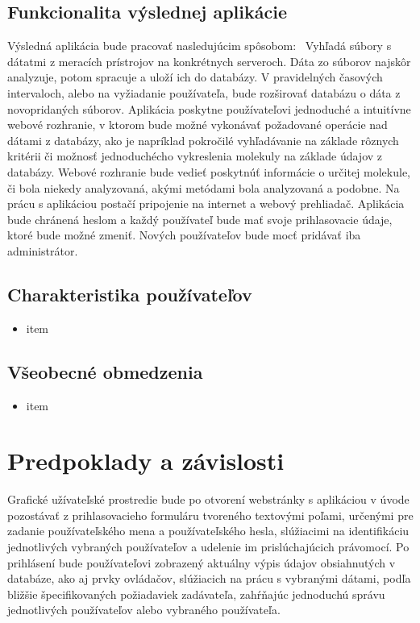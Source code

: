 \documentclass[12pt,a4paper]{article}
\begin{document}
\subsection{Funkcionalita výslednej aplikácie}
Výsledná aplikácia bude pracovať nasledujúcim spôsobom: \
Vyhľadá súbory s dátatmi z meracích prístrojov na konkrétnych serveroch. Dáta zo súborov najskôr analyzuje, potom spracuje a uloží ich do databázy.
V pravidelných časových intervaloch, alebo na vyžiadanie používateľa, bude rozširovať databázu o dáta z novopridaných súborov. Aplikácia poskytne používateľovi jednoduché a intuitívne webové rozhranie, v ktorom bude možné vykonávať požadované operácie nad dátami z databázy, ako je napríklad pokročilé vyhľadávanie na základe rôznych kritérii či možnosť jednoduchécho vykreslenia molekuly na základe údajov z databázy. Webové rozhranie bude vedieť poskytnúť informácie o určitej molekule, či bola niekedy analyzovaná, akými metódami bola analyzovaná a podobne. Na prácu s aplikáciou postačí pripojenie na internet a webový prehliadač. Aplikácia bude chránená heslom a každý používateľ bude mať svoje prihlasovacie údaje, ktoré bude možné zmeniť. Nových používateľov bude mocť pridávať iba administrátor.

\subsection{Charakteristika používateľov}
\begin{itemize}
	\item item
\end{itemize}

\subsection{Všeobecné obmedzenia}
\begin{itemize}
	\item item
\end{itemize}

\section{Predpoklady a závislosti}
Grafické užívateľské prostredie bude po otvorení webstránky s aplikáciou v úvode pozostávať z prihlasovacieho formuláru tvoreného textovými poľami, určenými pre zadanie používateľského mena a používateľského hesla, slúžiacimi na identifikáciu jednotlivých vybraných používateľov a udelenie im prislúchajúcich právomocí. Po prihlásení bude používateľovi zobrazený aktuálny výpis údajov obsiahnutých v databáze, ako aj prvky ovládačov, slúžiacich 
na prácu s vybranými dátami, podľa bližšie špecifikovaných požiadaviek zadávateľa, zahŕňajúc jednoduchú správu jednotlivých používateľov alebo vybraného používateľa.
\end{document}
